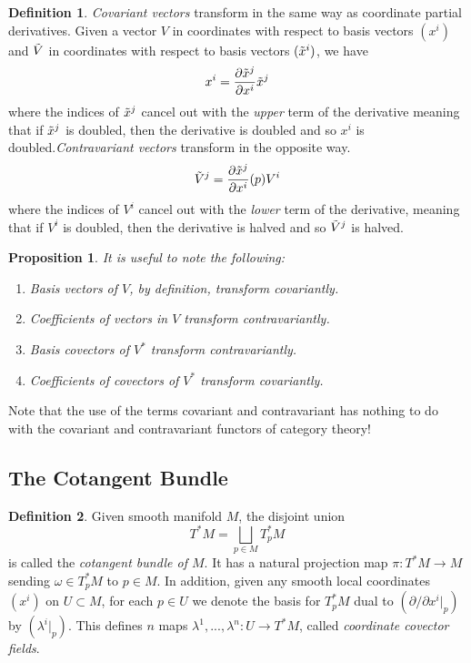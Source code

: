 \documentclass{article}
\newtheorem{proposition}[theorem]{Proposition}
\theoremstyle{remark}
\theoremstyle{definition}
\newtheorem{definition}{Definition}[section]
\begin{document}
\begin{definition}
\textit{Covariant vectors} transform in the same way as coordinate partial derivatives. Given a vector $V$ in coordinates with respect to basis vectors $(x^i)$ and $\Tilde{V}$ in coordinates with respect to basis vectors $(\Tilde{x}^i)$, we have
\[ x^i = \frac{\partial \Tilde{x}^j}{\partial x^i} \Tilde{x}^j\]
where the indices of $\Tilde{x}^j$ cancel out with the \textit{upper} term of the derivative meaning that if $\Tilde{x}^j$ is doubled, then the derivative is doubled and so $x^i$ is doubled.\textit{Contravariant vectors} transform in the opposite way. 
\[\Tilde{V}^j = \frac{\partial \Tilde{x}^j}{\partial x^i} (p) V^i\]
where the indices of $V^i$ cancel out with the \textit{lower} term of the derivative, meaning that if $V^i$ is doubled, then the derivative is halved and so $\Tilde{V}^j$ is halved. 
\end{definition}

\begin{proposition}
It is useful to note the following:
\begin{enumerate}
    \item Basis vectors of $V$, by definition, transform covariantly. 
    \item Coefficients of vectors in $V$ transform contravariantly. 
    \item Basis covectors of $V^*$ transform contravariantly. 
    \item Coefficients of covectors of $V^*$ transform covariantly. 
\end{enumerate}
\end{proposition}

Note that the use of the terms covariant and contravariant has nothing to do with the covariant and contravariant functors of category theory! 

\subsection{The Cotangent Bundle}
\begin{definition}
Given smooth manifold $M$, the disjoint union 
\[T^* M = \bigsqcup_{p \in M} T_p^* M\]
is called the \textit{cotangent bundle of $M$}. It has a natural projection map $\pi: T^* M \longrightarrow M$ sending $\omega \in T_p^* M$ to $p \in M$. In addition, given any smooth local coordinates $(x^i)$ on $U \subset M$, for each $p \in U$ we denote the basis for $T_p^* M$ dual to $(\partial / \partial x^i |_p )$ by $(\lambda^i |_p)$. This defines $n$ maps $\lambda^1, ..., \lambda^n: U \longrightarrow T^* M$, called \textit{coordinate covector fields}. 
\end{definition}
\end{document}
